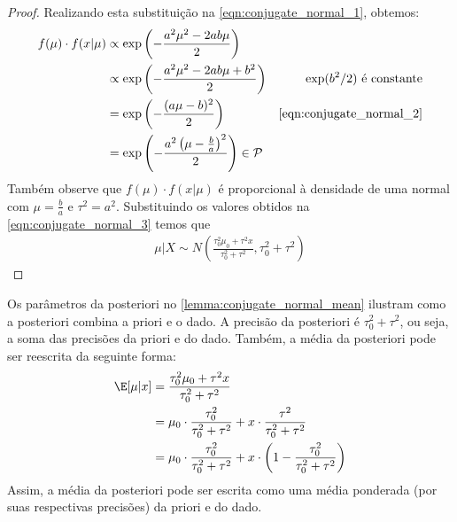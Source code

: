 \begin{proof}
 Realizando esta substituição na
 \cref{eqn:conjugate_normal_1}, obtemos:
 \begin{align*}
  f(\mu) \cdot f(x|\mu)
  &\propto \exp\left(-\frac{a^{2}\mu^{2}
  -2ab\mu}{2}\right) \\
  &\propto \exp\left(-\frac{a^{2}\mu^{2}
  -2ab\mu+b^{2}}{2}\right)
  & \exp(b^{2}/2) \text{ é constante} \\
  &= \exp\left(-\frac{(a\mu-b)^{2}}{2}\right)
  & \cref{eqn:conjugate_normal_2} \\
  &= \exp\left(-\frac{a^{2}
  \left(\mu-\frac{b}{a}\right)^{2}}{2}\right)
  \in \mathcal{P}
 \end{align*}
 Também observe que $f(\mu) \cdot f(x|\mu)$ é
 proporcional à densidade de uma normal com
 $\mu=\frac{b}{a}$ e $\tau^{2}=a^{2}$.
 Substituindo os valores obtidos na 
 \cref{eqn:conjugate_normal_3} temos que
 \begin{align*}
  \mu|X \sim N\left(\frac{\tau_{0}^{2}\mu_{0}+\tau^{2}x}
  {\tau_{0}^{2}+\tau^{2}},\tau_{0}^{2}+\tau^{2}\right)
 \end{align*}
\end{proof}

Os parâmetros da posteriori no
\cref{lemma:conjugate_normal_mean} ilustram como
a posteriori combina a priori e o dado.
A precisão da posteriori é $\tau_{0}^{2}+\tau^{2}$,
ou seja, a soma das precisões da priori e do dado.
Também, a média da posteriori pode ser reescrita da seguinte forma:
\begin{align*}
 \E[\mu|x]	&= \frac{\tau_{0}^{2}\mu_{0}+\tau^{2}x}
 {\tau_{0}^{2}+\tau^{2}} \\
 &= \mu_{0} \cdot \frac{\tau_{0}^{2}}
 {\tau_{0}^{2}+\tau^{2}}
 +x \cdot \frac{\tau^{2}}{\tau_{0}^{2}+\tau^{2}} \\
 &= \mu_{0} \cdot \frac{\tau_{0}^{2}}
 {\tau_{0}^{2}+\tau^{2}} 
 +x \cdot \left(1-\frac{\tau_{0}^{2}}
 {\tau_{0}^{2}+\tau^{2}}\right)
\end{align*}
Assim, a média da posteriori pode ser escrita como
uma média ponderada (por suas respectivas precisões)
da priori e do dado.

